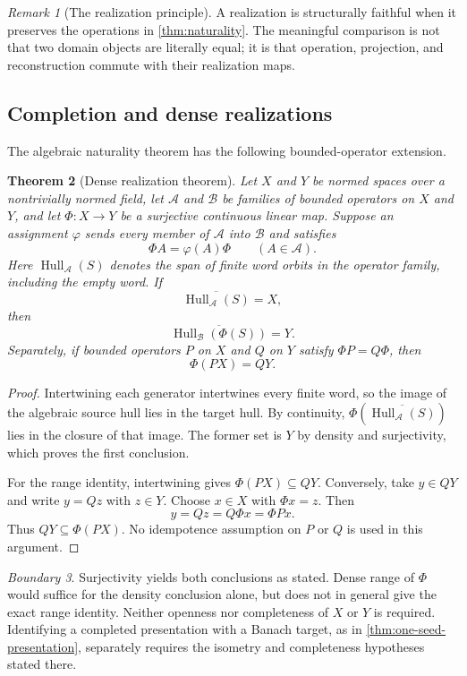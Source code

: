 \documentclass[11pt]{article}
\newtheorem{theorem}{Theorem}[section]
\theoremstyle{definition}
\theoremstyle{remark}
\newtheorem{remark}[theorem]{Remark}
\newtheorem{boundary}[theorem]{Boundary}
\newcommand{\cA}{\mathcal A}
\newcommand{\cB}{\mathcal B}
\newcommand{\Hull}{\operatorname{Hull}}
\newcommand{\closure}[1]{\overline{#1}}
\begin{document}
\begin{remark}[The realization principle]
A realization is structurally faithful when it preserves the operations in \cref{thm:naturality}. The meaningful comparison is not that two domain objects are literally equal; it is that operation, projection, and reconstruction commute with their realization maps.
\end{remark}

\subsection{Completion and dense realizations}

The algebraic naturality theorem has the following bounded-operator extension.

\begin{theorem}[Dense realization theorem]
\label{thm:dense-realization}
Let $X$ and $Y$ be normed spaces over a nontrivially normed field, let $\cA$ and $\cB$ be families of bounded operators on $X$ and $Y$, and let $\Phi:X\to Y$ be a surjective continuous linear map. Suppose an assignment $\varphi$ sends every member of $\cA$ into $\cB$ and satisfies
\[
\Phi A=\varphi(A)\Phi
\qquad(A\in\cA).
\]
Here $\Hull_{\cA}(S)$ denotes the span of finite word orbits in the operator family, including the empty word. If
\[
\closure{\Hull_{\cA}(S)}=X,
\]
then
\[
{\closure{\Hull_{\cB}(\Phi(S))}=Y.}
\]
Separately, if bounded operators $P$ on $X$ and $Q$ on $Y$ satisfy $\Phi P=Q\Phi$, then
\[
{\Phi(PX)=QY.}
\]
\end{theorem}

\begin{proof}
Intertwining each generator intertwines every finite word, so the image
of the algebraic source hull lies in the target hull. By continuity,
$\Phi(\overline{\Hull_{\cA}(S)})$ lies in the closure of that image.
The former set is $Y$ by density and surjectivity, which proves the first
conclusion.

For the range identity, intertwining gives $\Phi(PX)\subseteq QY$.
Conversely, take $y\in QY$ and write $y=Qz$ with $z\in Y$.
Choose $x\in X$ with $\Phi x=z$. Then
\[
 y=Qz=Q\Phi x=\Phi Px.
\]
Thus $QY\subseteq\Phi(PX)$. No idempotence assumption on $P$ or $Q$
is used in this argument.
\end{proof}

\begin{boundary}
Surjectivity yields both conclusions as stated. Dense range of $\Phi$ would suffice for the density conclusion alone, but does not in general give the exact range identity. Neither openness nor completeness of $X$ or $Y$ is required. Identifying a completed presentation with a Banach target, as in \cref{thm:one-seed-presentation}, separately requires the isometry and completeness hypotheses stated there.
\end{boundary}
\end{document}
